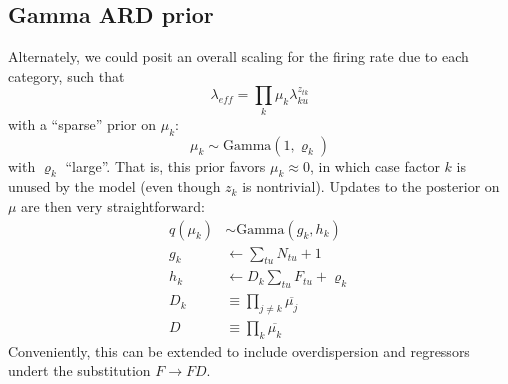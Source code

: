 \documentclass[11pt]{article}
\begin{document}
\subsection{Gamma ARD prior}
Alternately, we could posit an overall scaling for the firing rate due to each category, such that 
\begin{equation}
    \lambda_{eff} = \prod_{k} \mu_k\lambda_{ku}^{z_{tk}}
\end{equation}
with a ``sparse'' prior on $\mu_k$:
\begin{equation}
    \mu_k \sim \mathrm{Gamma}(1, \varrho_k)
\end{equation}
with $\varrho_k$ ``large''. That is, this prior favors $\mu_k \approx 0$, in which case factor $k$ is unused by the model (even though $z_k$ is nontrivial). Updates to the posterior on $\mu$ are then very straightforward:
\begin{align}
    q(\mu_k) &\sim \mathrm{Gamma}(g_k, h_k) \\
    g_k &\leftarrow \sum_{tu} N_{tu} + 1\\
    h_k &\leftarrow D_k \sum_{tu} F_{tu} + \varrho_k \\
    D_k &\equiv \prod_{j \neq k} \overline{\mu_j} \\
    D &\equiv \prod_k \overline{\mu_k}
\end{align}
Conveniently, this can be extended to include overdispersion and regressors undert the substitution $F \rightarrow F D$.
\end{document}
